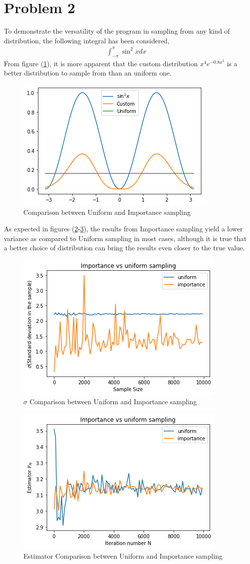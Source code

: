 \documentclass[a4paper,12pt]{article}
\begin{document}
    \section*{Problem 2}
    To demonstrate the versatility of the program in sampling from any kind of distribution, the following integral has been considered,
    \begin{gather}
        \int_{-\pi}^{\pi} \sin^2 x dx
    \end{gather}
    From figure (\ref{fig:UvIsampp2}), it is more apparent that the custom distribution $x^4e^{-0.8x^2}$ is a better distribution to sample from than an uniform one.\\
    \begin{figure}[h!]
        \centering
        \includegraphics[width=0.5\linewidth]{p2_prob.png}
        \caption{\label{fig:UvIsampp2}Comparison between Uniform and Importance sampling}
    \end{figure}
    As expected in figures (\ref{fig:UvIstdp2}-\ref{fig:UvIestp2}), the results from Importance sampling yield a lower variance as compared to Uniform sampling in most cases, although it is true that a better choice of distribution can bring the results even closer to the true value.
    \begin{figure}
        \centering
        \includegraphics[width=0.5\linewidth]{p2_stdev.png}
        \caption{\label{fig:UvIstdp2}$\sigma$ Comparison between Uniform and Importance sampling}
    \end{figure}
    \begin{figure}
        \centering
        \includegraphics[width=0.5\linewidth]{p2_est.png}
        \caption{\label{fig:UvIestp2}Estimator Comparison between Uniform and Importance sampling}
    \end{figure}
    \newpage
\end{document}
